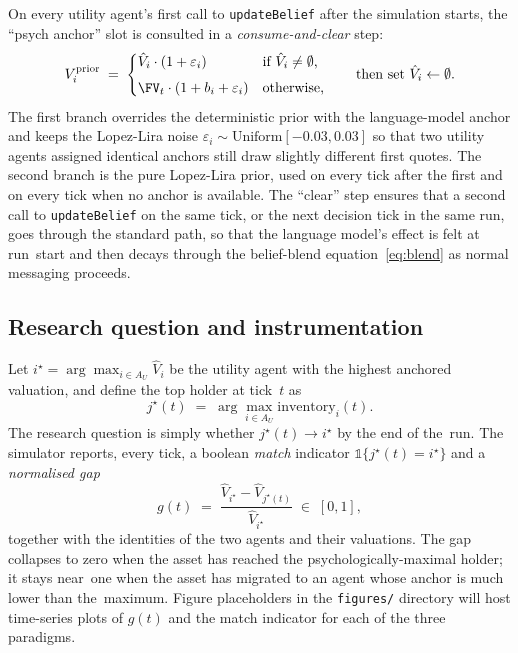 On every utility agent's first call to \texttt{updateBelief} after
the simulation starts, the ``psych anchor'' slot is consulted in a
\emph{consume-and-clear} step:
\begin{equation}
V_i^{\text{prior}} \;=\; \begin{cases}
\hat{V}_i\cdot(1+\varepsilon_i) & \text{if $\hat V_i\ne\emptyset$,}\\[4pt]
\FV_t\cdot(1+b_i+\varepsilon_i) & \text{otherwise,}
\end{cases}
\qquad \text{then set }\hat V_i\leftarrow\emptyset.
\label{eq:consume}
\end{equation}
The first branch overrides the deterministic prior with the
language-model anchor and keeps the Lopez-Lira noise
$\varepsilon_i\sim\text{Uniform}[-0.03,0.03]$ so that two utility
agents assigned identical anchors still draw slightly different
first quotes. The second branch is the pure Lopez-Lira prior, used
on every tick after the first and on every tick when no anchor is
available. The ``clear'' step ensures that a second call to
\texttt{updateBelief} on the same tick, or the next decision tick
in the same run, goes through the standard path, so that the
language model's effect is felt at run~start and then decays
through the belief-blend equation~\eqref{eq:blend} as normal
messaging proceeds.

\subsection{Research question and instrumentation}

Let $i^\star=\arg\max_{i\in A_U}\hat{V}_i$ be the utility agent
with the highest anchored valuation, and define the top holder at
tick~$t$ as
\begin{equation}
j^\star(t)\;=\;\arg\max_{i\in A_U}\text{inventory}_i(t).
\label{eq:top}
\end{equation}
The research question is simply whether $j^\star(t)\to i^\star$ by
the end of the~run. The simulator reports, every tick, a boolean
\emph{match} indicator $\mathbb{1}\{j^\star(t)=i^\star\}$ and a
\emph{normalised gap}
\begin{equation}
g(t)\;=\;\frac{\hat{V}_{i^\star}-\hat{V}_{j^\star(t)}}{\hat{V}_{i^\star}}\;\in\;[0,1],
\label{eq:gap}
\end{equation}
together with the identities of the two agents and their
valuations. The gap collapses to zero when the asset has reached
the psychologically-maximal holder; it stays near~one when the
asset has migrated to an agent whose anchor is much lower than
the~maximum. Figure placeholders in the \texttt{figures/} directory
will host time-series plots of $g(t)$ and the match indicator for
each of the three paradigms.

